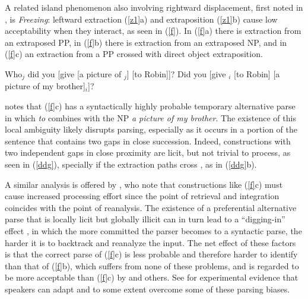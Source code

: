 \documentclass[output=paper
 	        ,biblatex
                ,babelshorthands
                ,newtxmath
                ,draftmode
                ,colorlinks, citecolor=brown
]{langscibook}
\begin{document}
A related island phenomenon also involving rightward displacement, first noted in \citet[305]{Ross67},
is \emph{Freezing}: leftward extraction (\ref{z1}a) and extraposition (\ref{z1}b) cause low acceptability when they interact, as seen in (\ref{f}). In (\ref{f}a) there is extraction from an extraposed PP,  in (\ref{f}b)  there is extraction from an extraposed NP,  and  in (\ref{f}c) an extraction from a PP crossed with direct object extraposition. 
 
 
\eal \label{z1}
\ex Who$_j$ did you [give [a picture of \spc$_j$] [to Robin]]?
\ex Did you [give \spc$_i$ [to Robin] [a picture of my brother]$_i$]?
\zl

\eal \label{f}
\zl


  \citet[457]{fodor78} notes that (\ref{f}c) has a syntactically highly probable temporary alternative parse  in which \emph{to} combines with the NP \emph{a picture of my brother}. The existence of this local ambiguity  likely disrupts  parsing, especially as it occurs in a portion of the sentence that contains two gaps in close succession. Indeed, constructions with two independent gaps in close proximity  are licit, but not trivial to process, as seen in (\ref{ddg}), specially if the  extraction paths cross  \citep{fodor78}, as in (\ref{ddg}b).

\eal \label{ddg}
\zl

\noindent
A similar analysis is offered by \citet[477]{freezing}, who note that  constructions like (\ref{f}c) must cause increased processing effort since the point of retrieval and integration coincides with the point of reanalysis. The existence of a preferential alternative parse that is locally licit but globally illicit  can in turn lead to a  ``digging-in'' effect \citep{ferreirahend,ferreirahend2,tabor3}, in which the  more committed the parser  becomes to a syntactic parse, the  harder it is to backtrack and reanalyze the  input. The net effect of these factors is that the correct parse of
(\ref{f}c) is less probable and therefore harder to identify than that of  (\ref{f}b), which suffers from none of  these problems, and is  regarded to be more acceptable than
 (\ref{f}c) by \citet[453]{fodor78} and others. See \citet{chavesf} for experimental evidence that speakers
 can adapt and to some extent overcome some of these parsing biases.
 
\end{document}
